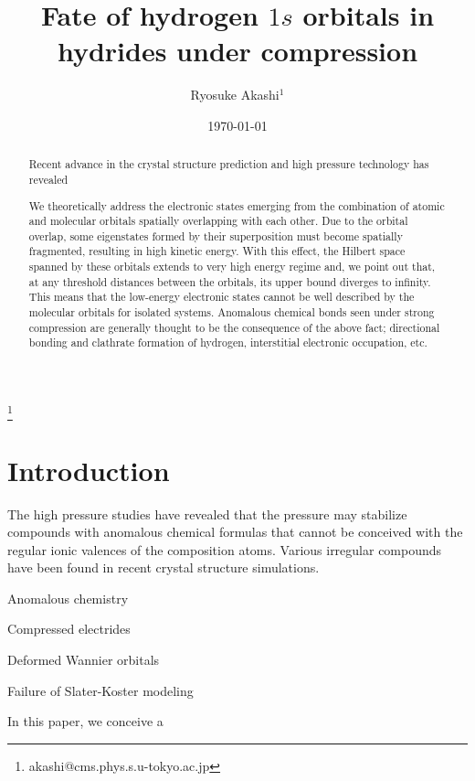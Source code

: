 \documentclass[twocolumn,showpacs,prb,amsfonts,amsmath,amssymb,floatfix,groupedaddress]{revtex4-1}
\begin{document}
\title{Fate of hydrogen $1s$ orbitals in hydrides under compression}
\author{Ryosuke Akashi$^{1}$}
\thanks{akashi@cms.phys.s.u-tokyo.ac.jp}

\date{\today}
\begin{abstract}
Recent advance in the crystal structure prediction and high pressure technology has revealed

We theoretically address the electronic states emerging from the combination of atomic and molecular orbitals spatially overlapping with each other. Due to the orbital overlap, some eigenstates formed by their superposition must become spatially fragmented, resulting in high kinetic energy. With this effect, the Hilbert space spanned by these orbitals extends to very high energy regime and, we point out that, at any threshold distances between the orbitals, its upper bound diverges to infinity. This means that the low-energy electronic states cannot be well described by the molecular orbitals for isolated systems. Anomalous chemical bonds seen under strong compression are generally thought to be the consequence of the above fact; directional bonding and clathrate formation of hydrogen, interstitial electronic occupation, etc.
\end{abstract}

\maketitle

\section{Introduction}
The high pressure studies have revealed that the pressure may stabilize compounds with anomalous chemical formulas that cannot be conceived with the regular ionic valences of the composition atoms. Various irregular compounds have been found in recent crystal structure simulations. 

Anomalous chemistry

Compressed electrides

Deformed Wannier orbitals

Failure of Slater-Koster modeling

In this paper, we conceive a 
\end{document}
